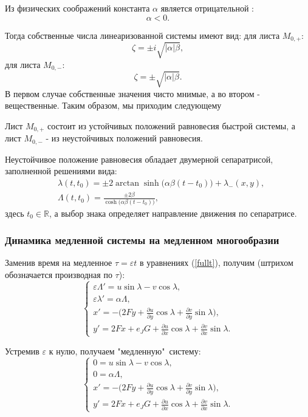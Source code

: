 Из физических соображений константа $\alpha$ является отрицательной \cite{wis1}:
$$\alpha < 0.$$

Тогда собственные числа линеаризованной системы имеют вид:
\newline
для листа $M_{0,+}$:
$$\zeta = \pm i \sqrt{|\alpha| \beta},$$
\newline
для листа $M_{0,-}$:
$$\zeta = \pm \sqrt{|\alpha| \beta}.$$
В первом случае собственные значения чисто мнимые, а во втором - вещественные. Таким образом, мы приходим  следующему

\begin{utv}
Лист $M_{0,+}$ состоит из устойчивых положений равновесия быстрой системы,  а лист $M_{0,-}$  - из неустойчивых положений равновесия.

Неустойчивое положение равновесия обладает двумерной сепаратрисой, заполненной решениями вида:
\begin{align*}
&\lambda(t, t_0) = \pm 2 \arctan \sinh \big( \alpha \beta (t-t_0) \big) + \lambda_{-}(x,y),\\
&\Lambda(t, t_0) = \frac{\pm 2 \beta}{\cosh \big( \alpha \beta (t-t_0) \big)},
\end{align*}
здесь $t_{0}\in \mathbb{R}$, а выбор знака определяет направление движения по сепаратрисе.
\end{utv}

\subsubsection{Динамика медленной системы на медленном многообразии}
Заменив время на медленное $\tau = \varepsilon t$ в уравнениях (\ref{fullt}), получим (штрихом обозначается производная по $\tau$):
\begin{equation}
    \begin{cases}
        \varepsilon \Lambda' = u \sin \lambda - v \cos \lambda, \\
        \varepsilon \lambda' = \alpha \Lambda,\\
        x' = - \big( 2Fy+\frac{\partial u}{\partial y} \cos \lambda + \frac{\partial v}{\partial y} \sin \lambda \big), \\
        y' = 2Fx+e_JG +\frac{\partial u}{\partial x} \cos \lambda + \frac{\partial v}{\partial x} \sin \lambda.
    \end{cases}
    \label{fulltau}
\end{equation}

Устремив $\varepsilon$ к нулю, получаем "медленную"\, систему:
\begin{equation}
    \begin{cases}
        0 = u \sin \lambda - v \cos \lambda, \\
        0 = \alpha \Lambda, \\
        x' = -\big( 2Fy+\frac{\partial u}{\partial y} \cos \lambda + \frac{\partial v}{\partial y} \sin \lambda \big), \\
        y' = 2Fx+e_JG +\frac{\partial u}{\partial x} \cos \lambda + \frac{\partial v}{\partial x} \sin \lambda.
    \end{cases}
    \label{slowreal}
\end{equation}

